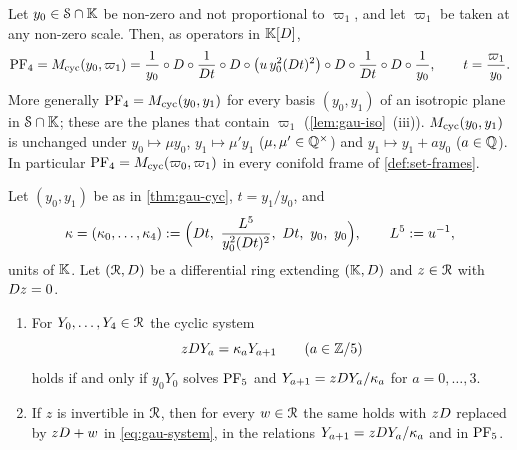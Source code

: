 \begin{thm}
\label{thm:gau-cyc}
Let $y_0\in\mathcal S\cap\mathbb{K}$ be non-zero and not proportional to $\varpi_1$, and let $\varpi_1$ be taken at any non-zero scale. Then, as operators in $\mathbb{K}[D]$,
\begin{equation}
\label{eq:gau-cyc}
\mathrm{PF}_{4}=M_{\mathrm{cyc}}(y_0,\varpi_1)=\frac1{y_0}\circ D\circ\frac1{D t}\circ D\circ\bigl(u\,y_0^2(D t)^2\bigr)\circ D\circ\frac1{D t}\circ D\circ\frac1{y_0},\qquad t=\frac{\varpi_1}{y_0}.
\end{equation}
More generally $\mathrm{PF}_{4}=M_{\mathrm{cyc}}(y_0,y_1)$ for every basis $(y_0,y_1)$ of an isotropic plane in $\mathcal S\cap\mathbb{K}$; these are the planes that contain $\varpi_1$ (\cref{lem:gau-iso}~(iii)). $M_{\mathrm{cyc}}(y_0,y_1)$ is unchanged under $y_0\mapsto\mu y_0$, $y_1\mapsto\mu'y_1$ ($\mu,\mu'\in\mathbb{Q}^\times$) and $y_1\mapsto y_1+ay_0$ ($a\in\mathbb{Q}$). In particular $\mathrm{PF}_{4}=M_{\mathrm{cyc}}(\varpi_0,\varpi_1)$ in every conifold frame of \cref{def:set-frames}.
\end{thm}

\begin{cor}
\label{cor:gau-cycsys}
Let $(y_0,y_1)$ be as in \cref{thm:gau-cyc}, $t=y_1/y_0$, and
\[
\kappa=(\kappa_0,\dots,\kappa_4):=\Bigl(\Dq t,\ \frac{L^5}{y_0^2(\Dq t)^2},\ \Dq t,\ y_0,\ y_0\Bigr),\qquad L^5:=u^{-1},
\]
units of $\mathbb{K}$. Let $(\mathcal{R},D)$ be a differential ring extending $(\mathbb{K},D)$ and $z\in\mathcal{R}$ with $D z=0$.
\begin{enumerate}
\item For $Y_0,\dots,Y_4\in\mathcal{R}$ the cyclic system
\begin{equation}
\label{eq:gau-system}
zD Y_a=\kappa_aY_{a+1}\qquad(a\in\mathbb{Z}/5)
\end{equation}
holds if and only if $y_0Y_0$ solves $\mathrm{PF}_{5}$ and $Y_{a+1}=zD Y_a/\kappa_a$ for $a=0,\dots,3$.
\item If $z$ is invertible in $\mathcal{R}$, then for every $w\in\mathcal{R}$ the same holds with $zD$ replaced by $zD+w$ in \eqref{eq:gau-system}, in the relations $Y_{a+1}=zD Y_a/\kappa_a$ and in $\mathrm{PF}_{5}$.
\end{enumerate}
\end{cor}


